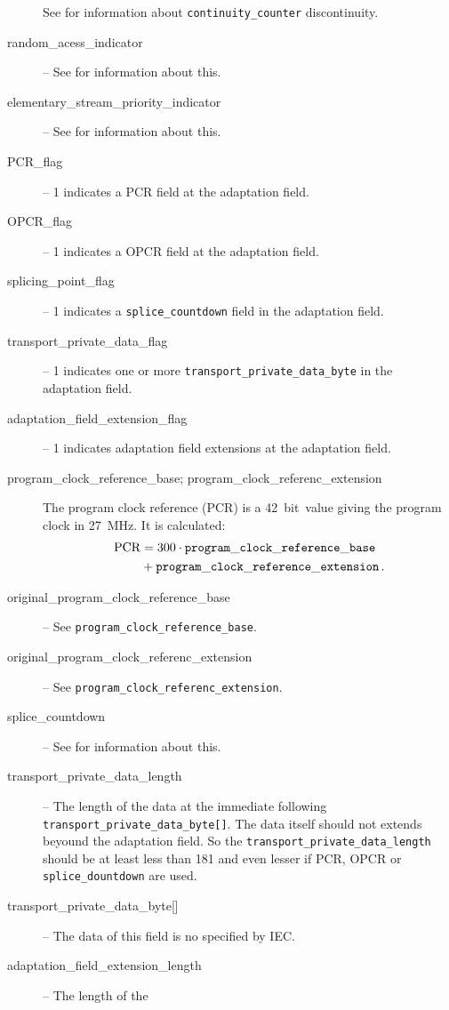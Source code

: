 \documentclass{scrartcl}
\begin{document}
\begin{description}
  See \cite[section~2.4.3.5]{iso13818-1} for information about
  \texttt{continuity\_counter} discontinuity.
\item[random\_acess\_indicator] -- See \cite[section~2.4.3.5]{iso13818-1} for
  information about this.
\item[elementary\_stream\_priority\_indicator] -- See
  \cite[section~2.4.3.5]{iso13818-1} for information about this.
\item[PCR\_flag] -- 1 indicates a PCR field at the adaptation field.
\item[OPCR\_flag] -- 1 indicates a OPCR field at the adaptation field.
\item[splicing\_point\_flag] -- 1 indicates a \texttt{splice\_countdown} field
  in the adaptation field.
\item[transport\_private\_data\_flag] -- 1 indicates one or more
  \texttt{transport\_private\_data\_byte} in the adaptation field.
\item[adaptation\_field\_extension\_flag] -- 1 indicates adaptation field
  extensions at the adaptation field.
\item[program\_clock\_reference\_base; program\_clock\_referenc\_extension]
  The program clock reference (PCR) is a 42~bit~value giving the program clock
  in 27~MHz. It is calculated:
  \begin{align}
  \mathrm{PCR} &= 300 \cdot \mathtt{program\_clock\_reference\_base} \notag\\
               &+ \mathtt{program\_clock\_reference\_extension}\,.
  \end{align}
\item[original\_program\_clock\_reference\_base] -- See
  \texttt{program\_clock\_reference\_base}.
\item[original\_program\_clock\_referenc\_extension] -- See
  \texttt{program\_clock\_referenc\_extension}.
\item[splice\_countdown] -- See
  \cite[section~2.4.3.5]{iso13818-1} for information about this.
\item[transport\_private\_data\_length] -- The length of the data at the
  immediate following \texttt{transport\_private\_data\_byte[]}. The data
  itself should not extends beyound the adaptation field. So the
  \texttt{transport\_private\_data\_length} should be at least less than 181
  and even lesser if PCR, OPCR or \texttt{splice\_dountdown} are used.
\item[{transport\_private\_data\_byte[]}] -- The data of this field is no
  specified by IEC.
\item[adaptation\_field\_extension\_length] -- The length of the 

\end{description}
\end{document}
